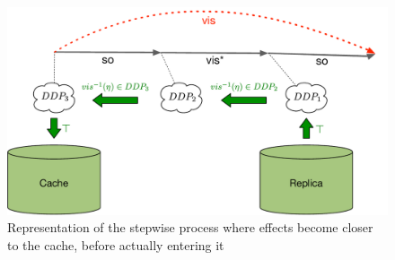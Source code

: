 \begin{figure}[t]
	\centering
	\includegraphics[scale = 0.4]{Figures/Availability_deg.pdf}
\caption{Representation of the stepwise process where effects become closer to
the cache, before actually entering it}
\end{figure}
